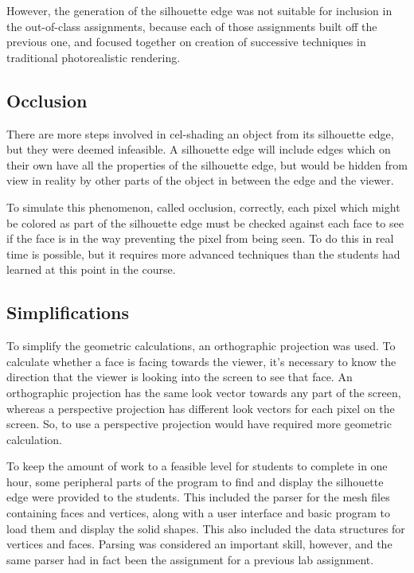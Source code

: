 \documentclass[10pt,twocolumn]{article}
\begin{document}
However, the generation of the silhouette edge was not suitable for inclusion in the out-of-class assignments, because each of those assignments built off the previous one, and focused together on creation of successive techniques in traditional photorealistic rendering.  

\subsection{Occlusion}
There are more steps involved in cel-shading an object from its silhouette edge, but they were deemed infeasible.  A silhouette edge will include edges which on their own have all the properties of the silhouette edge, but would be hidden from view in reality by other parts of the object in between the edge and the viewer.  

To simulate this phenomenon, called occlusion, correctly, each pixel which might be colored as part of the silhouette edge must be checked against each face to see if the face is in the way preventing the pixel from being seen.  To do this in real time is possible, but it requires more advanced techniques than the students had learned at this point in the course.  

\subsection{Simplifications}
To simplify the geometric calculations, an orthographic projection was used.  
To calculate whether a face is facing towards the viewer, it's necessary to know the direction that the viewer is looking into the screen to see that face.  An orthographic projection has the same look vector towards any part of the screen, whereas a perspective projection has different look vectors for each pixel on the screen.  So, to use a perspective projection would have required more geometric calculation.  

To keep the amount of work to a feasible level for students to complete in one hour, some peripheral parts of the program to find and display the silhouette edge were provided to the students.  This included the parser for the mesh files containing faces and vertices, along with a user interface and basic program to load them and display the solid shapes.  This also included the data structures for vertices and faces.  Parsing was considered an important skill, however, and the same parser had in fact been the assignment for a previous lab assignment.  
\end{document}
